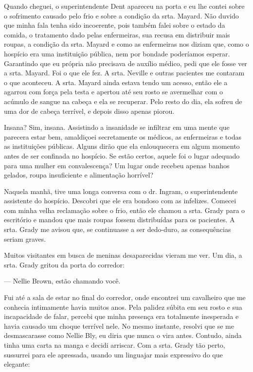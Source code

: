 Quando cheguei, o superintendente Dent apareceu na porta e eu lhe contei
sobre o sofrimento causado pelo frio e sobre a condição da srta. Mayard.
Não duvido que minha fala tenha sido incoerente, pois também falei sobre
o estado da comida, o tratamento dado pelas enfermeiras, sua recusa em
distribuir mais roupas, a condição da srta. Mayard e como as enfermeiras
nos diziam que, como o hospício era uma instituição pública, nem por
bondade poderíamos esperar. Garantindo que eu própria não precisava de
auxílio médico, pedi que ele fosse ver a srta. Mayard. Foi o que ele
fez. A srta. Neville e outras pacientes me contaram o que aconteceu. A
srta. Mayard ainda estava tendo um acesso, então ele a agarrou com força
pela testa e apertou até seu rosto se avermelhar com o acúmulo de sangue
na cabeça e ela se recuperar. Pelo resto do dia, ela sofreu de uma dor
de cabeça terrível, e depois disso apenas piorou.

Insana? Sim, insana. Assistindo a insanidade se infiltrar em uma mente
que parecera estar bem, amaldiçoei secretamente os médicos, as
enfermeiras e todas as instituições públicas. Alguns dirão que ela
enlouquecera em algum momento antes de ser confinada no hospício. Se
estão certos, aquele foi o lugar adequado para uma mulher em
convalescença? Um lugar onde recebeu apenas banhos gelados, roupa
insuficiente e alimentação horrível?

Naquela manhã, tive uma longa conversa com o dr. Ingram, o
superintendente assistente do hospício. Descobri que ele era bondoso com
as infelizes. Comecei com minha velha reclamação sobre o frio, então ele
chamou a srta. Grady para o escritório e mandou que mais roupas fossem
distribuídas para os pacientes. A srta. Grady me avisou que, se
continuasse a ser dedo-duro, as consequências seriam graves.

Muitos visitantes em busca de meninas desaparecidas vieram me ver. Um
dia, a srta. Grady gritou da porta do corredor:

--- Nellie Brown, estão chamando você.

Fui até a sala de estar no final do corredor, onde encontrei um
cavalheiro que me conhecia intimamente havia muitos anos. Pela palidez
súbita em seu rosto e sua incapacidade de falar, percebi que minha
presença era totalmente inesperada e havia causado um choque terrível
nele. No mesmo instante, resolvi que se me desmascarasse como Nellie
Bly, eu diria que nunca o vira antes. Contudo, ainda tinha uma carta na
manga e decidi arriscar. Com a srta. Grady tão perto, sussurrei para ele
apressada, usando um linguajar mais expressivo do que elegante:

